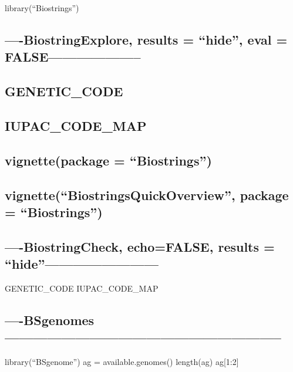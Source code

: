 \documentclass[]{article}
\begin{document}
library(``Biostrings'')

\subsection{\texorpdfstring{----BiostringExplore, results = ``hide'',
eval =
FALSE--------------------}{----BiostringExplore, results = hide, eval = FALSE--------------------}}\label{biostringexplore-results-hide-eval-false}

\subsection{GENETIC\_CODE}\label{genetic_code}

\subsection{IUPAC\_CODE\_MAP}\label{iupac_code_map}

\subsection{\texorpdfstring{vignette(package =
``Biostrings'')}{vignette(package = Biostrings)}}\label{vignettepackage-biostrings}

\subsection{\texorpdfstring{vignette(``BiostringsQuickOverview'',
package =
``Biostrings'')}{vignette(BiostringsQuickOverview, package = Biostrings)}}\label{vignettebiostringsquickoverview-package-biostrings}

\subsection{\texorpdfstring{----BiostringCheck, echo=FALSE, results =
``hide''------------------------}{----BiostringCheck, echo=FALSE, results = hide------------------------}}\label{biostringcheck-echofalse-results-hide}

GENETIC\_CODE IUPAC\_CODE\_MAP

\subsection{----BSgenomes-----------------------------------------------------------}\label{bsgenomes}

library(``BSgenome'') ag = available.genomes() length(ag) ag{[}1:2{]}
\end{document}
